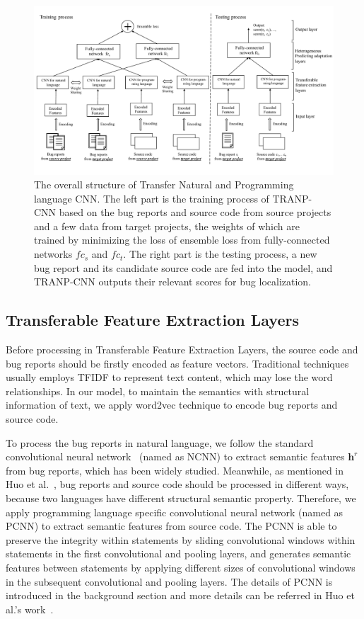 \begin{figure}[hbt]
\centering
\includegraphics[width = 2\columnwidth]{pic/structure.pdf}
\caption{The overall structure of Transfer Natural and Programming language CNN.  The left part is the training process of TRANP-CNN based on the bug reports and source code from source projects and a few data from target projects, the weights of which are trained by minimizing the loss of ensemble loss from fully-connected networks $fc_s$ and $fc_t$. The right part is the testing process, a new bug report and its candidate source code are fed into the model, and TRANP-CNN outputs their relevant scores for bug localization.}
\label{fig:structure}
\end{figure}

\subsection{Transferable Feature Extraction Layers}
Before processing in Transferable Feature Extraction Layers, the source code and bug reports should be firstly encoded as feature vectors. Traditional techniques usually employs TFIDF to represent text content, which may lose the word relationships. In our model, to maintain the semantics with structural information of text, we apply word2vec technique to encode bug reports and source code.

To process the bug reports in natural language, we follow the standard convolutional neural network~\cite{kim2014convolutional} (named as NCNN) to extract semantic features $\mathbf{h}^r$ from bug reports, which has been widely studied. Meanwhile, as mentioned in Huo et al.~\cite{huo2016learning}, bug reports and source code should be processed in different ways, because two languages have different structural semantic property. Therefore, we apply programming language specific convolutional neural network (named as PCNN) to extract semantic features from source code. The PCNN is able to preserve the integrity within statements by sliding convolutional windows within statements in the first convolutional and pooling layers, and generates semantic features between statements by applying  different sizes of convolutional windows in the subsequent convolutional and pooling layers. The details of PCNN is introduced in the background section and more details can be referred in Huo et al.'s work~\cite{huo2016learning}.

